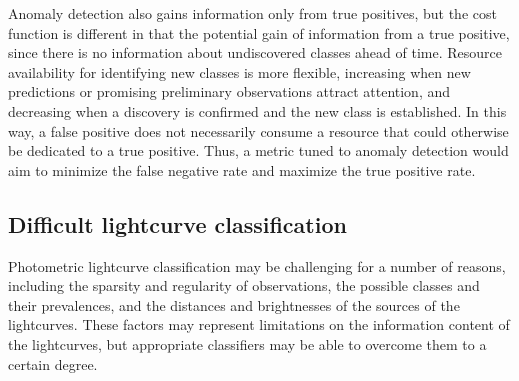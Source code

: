 Anomaly detection also gains information only from true positives, but the cost function is different in that the potential gain of information from a true positive, since there is no information about undiscovered classes ahead of time.
Resource availability for identifying new classes is more flexible, increasing when new predictions or promising preliminary observations attract attention, and decreasing when a discovery is confirmed and the new class is established.
In this way, a false positive does not necessarily consume a resource that could otherwise be dedicated to a true positive.
Thus, a metric tuned to anomaly detection would aim to minimize the false negative rate and maximize the true positive rate.

%

\subsection{Difficult lightcurve classification}
\label{sec:difficult}

Photometric lightcurve classification may be challenging for a number of reasons, including the sparsity and regularity of observations, the possible classes and their prevalences, and the distances and brightnesses of the sources of the lightcurves.
These factors may represent limitations on the information content of the lightcurves, but appropriate classifiers may be able to overcome them to a certain degree.

